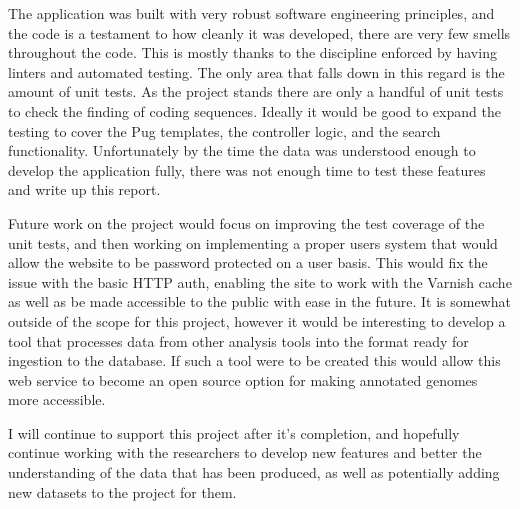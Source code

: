 The application was built with very robust software engineering principles, and the code is a testament to how cleanly it was developed, there are very few smells\cite{smells} throughout the code. This is mostly thanks to the discipline enforced by having linters and automated testing. The only area that falls down in this regard is the amount of unit tests. As the project stands there are only a handful of unit tests to check the finding of coding sequences. Ideally it would be good to expand the testing to cover the Pug templates, the controller logic, and the search functionality. Unfortunately by the time the data was understood enough to develop the application fully, there was not enough time to test these features and write up this report. 

Future work on the project would focus on improving the test coverage of the unit tests, and then working on implementing a proper users system that would allow the website to be password protected on a user basis. This would fix the issue with the basic HTTP auth, enabling the site to work with the Varnish cache as well as be made accessible to the public with ease in the future. It is somewhat outside of the scope for this project, however it would be interesting to develop a tool that processes data from other analysis tools into the format ready for ingestion to the database. If such a tool were to be created this would allow this web service to become an open source option for making annotated genomes more accessible. 

I will continue to support this project after it's completion, and hopefully continue working with the researchers to develop new features and better the understanding of the data that has been produced, as well as potentially adding new datasets to the project for them. 


